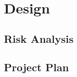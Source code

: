 \chapter{Design}\label{ch:design}

\section{Risk Analysis}\label{sec:risk-analysis}

\section{Project Plan}\label{sec:project-plan}

